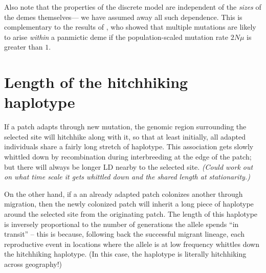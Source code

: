 \documentclass{article}
\newcommand{\plr}[1]{{\it\color{blue}(#1)}}
\begin{document}

Also note that the properties of the discrete model are independent of the {\em sizes} of the demes themselves--- we have assumed away all such dependence.
This is complementary to the results of \cite{softsweepsII}, who showed that multiple mutations are likely to arise {\em within} a panmictic deme
if the population-scaled mutation rate $2 N \mu$ is greater than $1$.


\section{Length of the hitchhiking haplotype}
\label{ss:haplotype_length}

If a patch adapts through new mutation, the genomic region surrounding the selected site will hitchhike \citep{hitchhiking} along with it,
so that at least initially, all adapted individuals share a fairly long stretch of haplotype.
This association gets slowly whittled down by recombination during interbreeding at the edge of the patch;
but there will always be longer LD nearby to the selected site.
\plr{Could work out on what time scale it gets whittled down and the shared length at stationarity.}

On the other hand, if a an already adapted patch colonizes another through migration,
then the newly colonized patch will inherit a long piece of haplotype around the selected site from the originating patch.
The length of this haplotype is inversely proportional to the number of generations the allele spends ``in transit'' --
this is because, following back the successful migrant lineage, 
each reproductive event in locations where the allele is at low frequency
whittles down the hitchhiking haplotype.
(In this case, the haplotype is literally hitchhiking across geography!)
\end{document}
